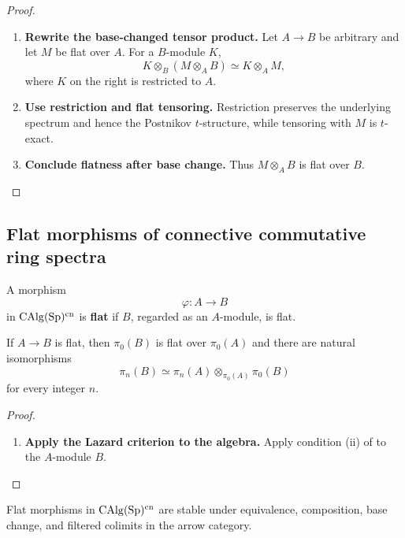 \begin{proof}
\begin{enumerate}[label=\textup{(\arabic*)}]
    \item \textbf{Rewrite the base-changed tensor product.}
    Let \(A\to B\) be arbitrary and let \(M\) be flat over \(A\). For a
    \(B\)-module \(K\),
    \[
        K\otimes_B(M\otimes_AB)
        \simeq
        K\otimes_AM,
    \]
    where \(K\) on the right is restricted to \(A\).

    \item \textbf{Use restriction and flat tensoring.}
    Restriction preserves
    the underlying spectrum and hence the Postnikov \(t\)-structure, while
    tensoring with \(M\) is \(t\)-exact.

    \item \textbf{Conclude flatness after base change.}
    Thus \(M\otimes_AB\) is flat over
    \(B\).
\end{enumerate}
\end{proof}

\subsection{Flat morphisms of connective commutative ring spectra}

\begin{definition}
\label{def:flat-spectral-algebra-morphism}
A morphism
\[
    \varphi
    \colon
    A
    \longrightarrow
    B
\]
in $\operatorname{CAlg}(\operatorname{Sp})^{\mathrm{cn}}$ is \textbf{flat} if $B$, regarded as an
$A$-module, is flat.
\end{definition}

\begin{proposition}
\label{prop:homotopy-groups-flat-algebra}
If $A\to B$ is flat, then $\pi_0(B)$ is flat over $\pi_0(A)$ and there are
natural isomorphisms
\[
    \pi_n(B)
    \simeq
    \pi_n(A)
    \otimes_{\pi_0(A)}
    \pi_0(B)
\]
for every integer $n$.
\end{proposition}

\begin{proof}
\leavevmode
\begin{enumerate}[label=\textup{(\arabic*)}]
    \item \textbf{Apply the Lazard criterion to the algebra.}
    Apply condition (ii) of  to the $A$-module $B$.
\end{enumerate}
\end{proof}

\begin{proposition}
\label{prop:flat-algebra-permanence}
Flat morphisms in \(\operatorname{CAlg}(\operatorname{Sp})^{\mathrm{cn}}\) are stable under equivalence,
composition, base change, and filtered colimits in the arrow category.
\end{proposition}

